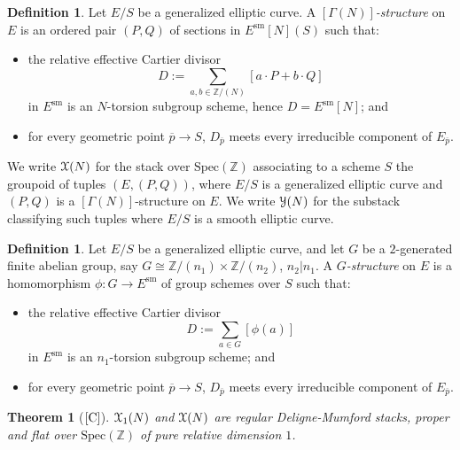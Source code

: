 \documentclass[11pt]{amsart}
\newtheorem{theorem}[subsection]{Theorem}
\theoremstyle{definition}
\newtheorem{definition}[subsection]{Definition}
\begin{document}
\begin{definition}\label{gammaelliptic}
Let $E/S$ be a generalized elliptic curve. A \textit{$[\Gamma(N)]$-structure} on $E$ is an ordered pair $(P,Q)$ of sections in $E^{\mathrm{sm}}[N](S)$ such that:
\begin{itemize}
  \item the relative effective Cartier divisor 
  \begin{displaymath}
  D := \sum_{a,b \in \mathbb{Z}/(N)} [a\cdot P + b \cdot Q]
  \end{displaymath}
  in $E^{\mathrm{sm}}$ is an $N$-torsion subgroup scheme, hence $D = E^{\mathrm{sm}}[N]$; and 
  \item for every geometric point $\overline{p} \rightarrow S$, $D_{\overline{p}}$ meets every irreducible component of $E_{\overline{p}}$.
\end{itemize}
We write ${\mathbf{\EuScript{X}}}(N)$ for the stack over $\mathrm{Spec}(\mathbb{Z})$  associating to a scheme $S$ the groupoid of tuples $(E,(P,Q))$, where $E/S$ is a generalized elliptic curve and $(P,Q)$ is a $[\Gamma(N)]$-structure on $E$. We write ${\mathbf{\EuScript{Y}}}(N)$ for the substack classifying such tuples where $E/S$ is a smooth elliptic curve.
\end{definition}

\begin{definition}\label{gstructure}
Let $E/S$ be a generalized elliptic curve, and let $G$ be a $2$-generated finite abelian group, say $G \cong \mathbb{Z}/(n_1) \times \mathbb{Z}/(n_2)$, $n_2|n_1$. A \textit{$G$-structure} on $E$ is a homomorphism $\phi: G \rightarrow E^{\mathrm{sm}}$ of group schemes over $S$ such that:
\begin{itemize}
  \item the relative effective Cartier divisor 
  \begin{displaymath}
  D := \sum_{a \in G} [\phi(a)]
  \end{displaymath}
  in $E^{\mathrm{sm}}$ is an $n_1$-torsion subgroup scheme; and 
  \item for every geometric point $\overline{p} \rightarrow S$, $D_{\overline{p}}$ meets every irreducible component of $E_{\overline{p}}$.
\end{itemize}
\end{definition}

\begin{theorem}[$\textrm{\cite[3.1.7, 3.2.7, 3.3.1, 4.1.1]{C}}$]
${\mathbf{\EuScript{X}}}_1(N)$ and ${\mathbf{\EuScript{X}}}(N)$ are regular Deligne-Mumford stacks, proper and flat over $\mathrm{Spec}(\mathbb{Z})$ of pure relative dimension $1$.
\end{theorem}
\end{document}
